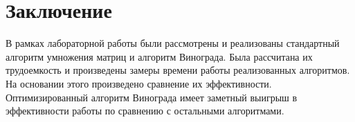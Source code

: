 \chapter*{Заключение}

В рамках лабораторной работы были рассмотрены и реализованы стандартный алгоритм
умножения матриц и алгоритм Винограда. Была рассчитана их трудоемкость и произведены
замеры времени работы реализованных алгоритмов. На основании этого произведено сравнение их эффективности. Оптимизированный алгоритм Винограда имеет заметный выигрыш
в эффективности работы по сравнению с остальными алгоритмами.
